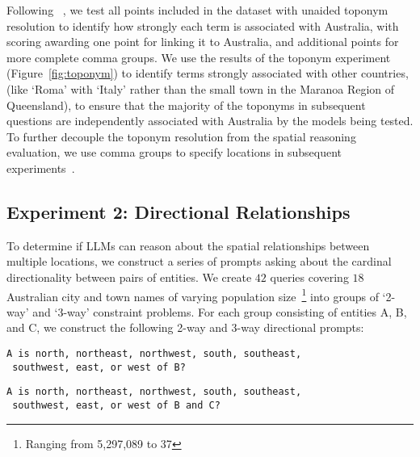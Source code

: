 \noindent Following \citeauthor{Osullivan2024}~\cite{Osullivan2024}, we test all points included in the dataset with unaided toponym resolution to identify how strongly each term is associated with Australia, with scoring awarding one point for linking it to Australia, and additional points for more complete comma groups.
We use the results of the toponym experiment (Figure~\ref{fig:toponym}) to identify terms strongly associated with other countries, (like `Roma' with `Italy' rather than the small town in the Maranoa Region of Queensland), to ensure that the majority of the toponyms in subsequent questions are independently associated with Australia by the models being tested.
To further decouple the toponym resolution from the spatial reasoning evaluation, we use comma groups to specify locations in subsequent experiments~\cite{Lieberman2010}.






\subsection{Experiment 2: Directional Relationships}

To determine if LLMs can reason about the spatial relationships between multiple locations, we construct a series of prompts asking about the cardinal directionality between pairs of entities.
We create $42$ queries covering $18$ Australian city and town names of varying population size~\footnote{Ranging from 5,297,089 to 37} into groups of `2-way' and `3-way' constraint problems.
For each group consisting of entities A, B, and C, we construct the following 2-way and 3-way directional prompts: 

\begin{lstlisting}[title=Prompt 3: 2-way Directional Prompt]
 A is north, northeast, northwest, south, southeast, 
 southwest, east, or west of B?
\end{lstlisting}

\begin{lstlisting}[title=Prompt 4: 3-way Directional Prompt]
 A is north, northeast, northwest, south, southeast, 
 southwest, east, or west of B and C?
\end{lstlisting}

